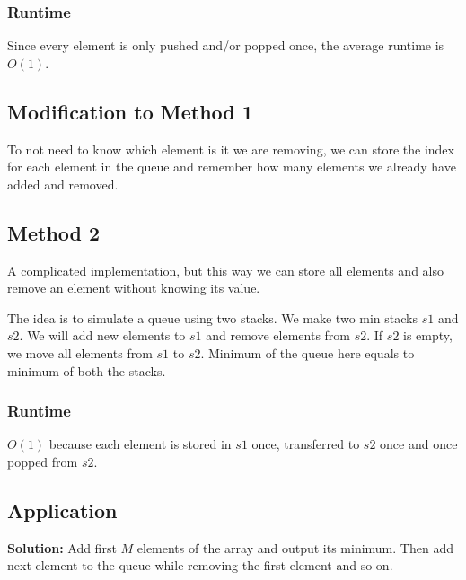 \documentclass{article}
\begin{document}
	\subsubsection{Runtime}
	Since every element is only pushed and/or popped once, the average runtime is $O(1)$.
	
	\subsection{Modification to Method 1}
	To not need to know which element is it we are removing, we can store the index for each element in the queue and remember how many elements we already have added and removed.
	
	\subsection{Method 2}
	A complicated implementation, but this way we can store all elements and also remove an element without knowing its value. \newline
	
	The idea is to simulate a queue using two stacks. We make two min stacks $s1$ and $s2$. We will add new elements to $s1$ and remove elements from $s2$. If $s2$ is empty, we move all elements from $s1$ to $s2$. Minimum of the queue here equals to minimum of both the stacks.
	
	\subsubsection{Runtime}
	$O(1)$ because each element is stored in $s1$ once, transferred to $s2$ once and once popped from $s2$.
	
	\subsection{Application}
	\begin{algorithm}[H]
		\SetAlgoLined
		\caption{Finding minimum for all subarrays of given length $M$}
	\end{algorithm}
	\vspace{5mm}
	\textbf{Solution:} Add first $M$ elements of the array and output its minimum. Then add next element to the queue while removing the first element and so on. \newpage
	
\end{document}

